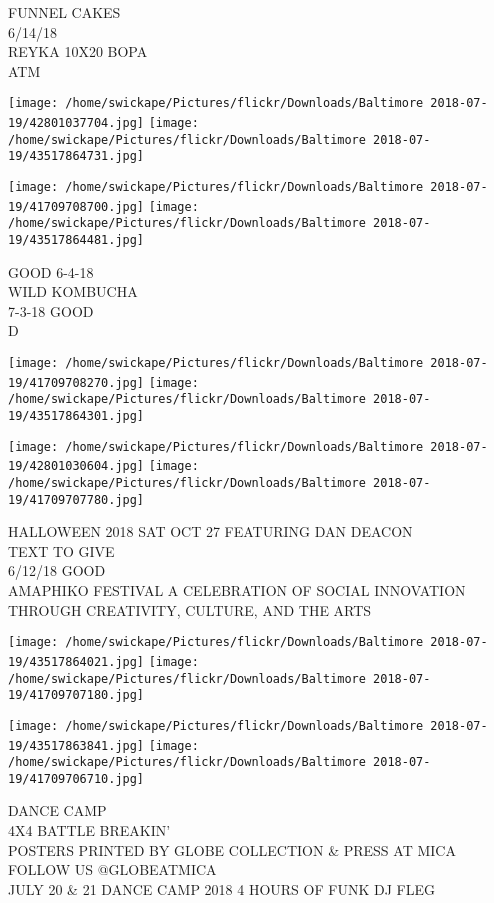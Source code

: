 \documentclass[10pt,letterpaper]{article}
\begin{document}
FUNNEL CAKES\\
6/14/18\\
REYKA 10X20 BOPA\\
ATM\\
\pagebreak

\texttt{[image: /home/swickape/Pictures/flickr/Downloads/Baltimore 2018-07-19/42801037704.jpg]}
\texttt{[image: /home/swickape/Pictures/flickr/Downloads/Baltimore 2018-07-19/43517864731.jpg]}

\texttt{[image: /home/swickape/Pictures/flickr/Downloads/Baltimore 2018-07-19/41709708700.jpg]}
\texttt{[image: /home/swickape/Pictures/flickr/Downloads/Baltimore 2018-07-19/43517864481.jpg]}

GOOD 6{-}4{-}18\\
WILD KOMBUCHA\\
7{-}3{-}18 GOOD\\
D\\
\pagebreak

\texttt{[image: /home/swickape/Pictures/flickr/Downloads/Baltimore 2018-07-19/41709708270.jpg]}
\texttt{[image: /home/swickape/Pictures/flickr/Downloads/Baltimore 2018-07-19/43517864301.jpg]}

\texttt{[image: /home/swickape/Pictures/flickr/Downloads/Baltimore 2018-07-19/42801030604.jpg]}
\texttt{[image: /home/swickape/Pictures/flickr/Downloads/Baltimore 2018-07-19/41709707780.jpg]}

HALLOWEEN 2018 SAT OCT 27 FEATURING DAN DEACON\\
TEXT TO GIVE\\
6/12/18 GOOD\\
AMAPHIKO FESTIVAL A CELEBRATION OF SOCIAL INNOVATION THROUGH CREATIVITY, CULTURE, AND THE ARTS\\
\pagebreak

\texttt{[image: /home/swickape/Pictures/flickr/Downloads/Baltimore 2018-07-19/43517864021.jpg]}
\texttt{[image: /home/swickape/Pictures/flickr/Downloads/Baltimore 2018-07-19/41709707180.jpg]}

\texttt{[image: /home/swickape/Pictures/flickr/Downloads/Baltimore 2018-07-19/43517863841.jpg]}
\texttt{[image: /home/swickape/Pictures/flickr/Downloads/Baltimore 2018-07-19/41709706710.jpg]}

DANCE CAMP\\
4X4 BATTLE BREAKIN'\\
POSTERS PRINTED BY GLOBE COLLECTION \& PRESS AT MICA FOLLOW US @GLOBEATMICA\\
JULY 20 \& 21 DANCE CAMP 2018 4 HOURS OF FUNK DJ FLEG\\
\pagebreak
\end{document}
